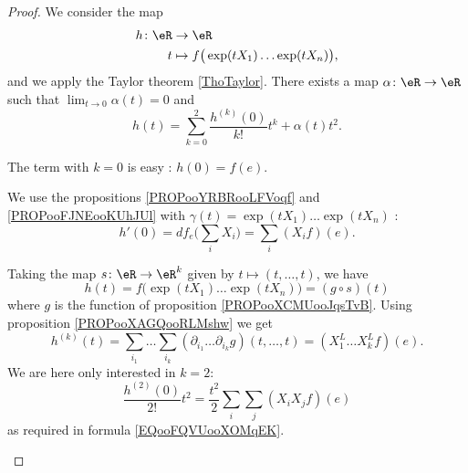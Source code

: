 \begin{proof}
	We consider the map
	\begin{equation}
		\begin{aligned}
			h\colon \eR & \to \eR                                           \\
			t           & \mapsto f\big( \exp(tX_1)\ldots \exp(tX_n) \big),
		\end{aligned}
	\end{equation}
	and we apply the Taylor theorem \ref{ThoTaylor}. There exists a map \(\alpha \colon \eR\to \eR  \) such that \( \lim_{t\to 0}\alpha(t)=0\) and
	\begin{equation}
		h(t)=\sum_{k=0}^2\frac{ h^{(k)}(0) }{ k! }t^k+\alpha(t)t^2.
	\end{equation}

	\begin{subproof}
		\spitem[Term \( k=0\)]
		The term with \( k=0\) is easy : \( h(0)=f(e)\).

		\spitem[Term \( k=1\)]
		We use the propositions \ref{PROPooYRBRooLFVoqf} and \ref{PROPooFJNEooKUhJUl} with \( \gamma(t)=\exp(tX_1)\ldots \exp(tX_n)\) :
		\begin{equation}
			h'(0)=df_e\big( \sum_iX_i \big)=\sum_i(X_if)(e).
		\end{equation}

		\spitem[Term \( k=2\)]
		Taking the map \(s \colon \eR\to \eR^k  \) given by \( t\mapsto (t,\ldots,t)\), we have
		\begin{equation}
			h(t)=f\big( \exp(tX_1)\ldots \exp(tX_n) \big)=(g\circ s)(t)
		\end{equation}
		where \( g\) is the function of proposition \ref{PROPooXCMUooJqsTvB}. Using proposition \ref{PROPooXAGQooRLMshw} we get
		\begin{equation}
			h^{(k)}(t)=\sum_{i_1}\ldots \sum_{i_k}(\partial_{i_1}\ldots\partial_{i_k}g)(t,\ldots,t)=(X_1^L\ldots X_k^Lf)(e).
		\end{equation}
		We are here only interested in \( k=2\):
		\begin{equation}
			\frac{ h^{(2)}(0) }{2!}t^2=\frac{ t^2 }{2}\sum_i\sum_j(X_iX_jf)(e)
		\end{equation}
		as required in formula \ref{EQooFQVUooXOMqEK}.
	\end{subproof}
\end{proof}

